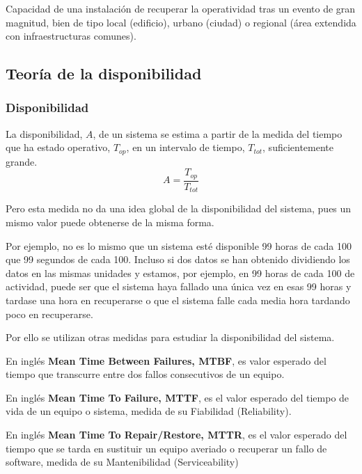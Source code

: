 \begin{defn}
Capacidad de una instalación de
recuperar la operatividad tras un evento de gran magnitud, bien de tipo local (edificio), urbano (ciudad) o regional (área extendida con infraestructuras comunes).
\end{defn}

\subsection{Teoría de la disponibilidad}
\subsubsection{Disponibilidad}
La disponibilidad, $A$, de un sistema se estima a partir de la medida del tiempo que ha estado operativo, $T_{op}$, en un intervalo de tiempo, $T_{tot}$, suficientemente grande.
\[A= \frac{T_{op}}{T_{tot}}\]

Pero esta medida no da una idea global de la disponibilidad del sistema, pues un mismo valor puede obtenerse de la misma forma.

Por ejemplo, no es lo mismo que un sistema esté disponible 99 horas de cada 100 que 99 segundos de cada 100. Incluso si dos datos se han obtenido dividiendo los datos en las mismas unidades y estamos, por ejemplo, en 99 horas de cada 100 de actividad, puede ser que el sistema haya fallado una única vez en esas 99 horas y tardase una hora en recuperarse o que el sistema falle cada media hora tardando poco en recuperarse.

Por ello se utilizan otras medidas para estudiar la disponibilidad del sistema.

\begin{defn}

En inglés \textbf{Mean Time Between Failures, MTBF}, es valor esperado del tiempo que transcurre entre dos fallos consecutivos de un equipo.
\end{defn}

\begin{defn}

En inglés \textbf{Mean Time To Failure, MTTF}, es el valor esperado del tiempo de vida de un equipo o sistema, medida de su Fiabilidad (Reliability).
\end{defn}

\begin{defn}

En inglés \textbf{Mean Time To Repair/Restore, MTTR}, es el valor esperado del tiempo que se tarda en sustituir un equipo averiado o recuperar un fallo de software, medida de su Mantenibilidad (Serviceability)
\end{defn}

